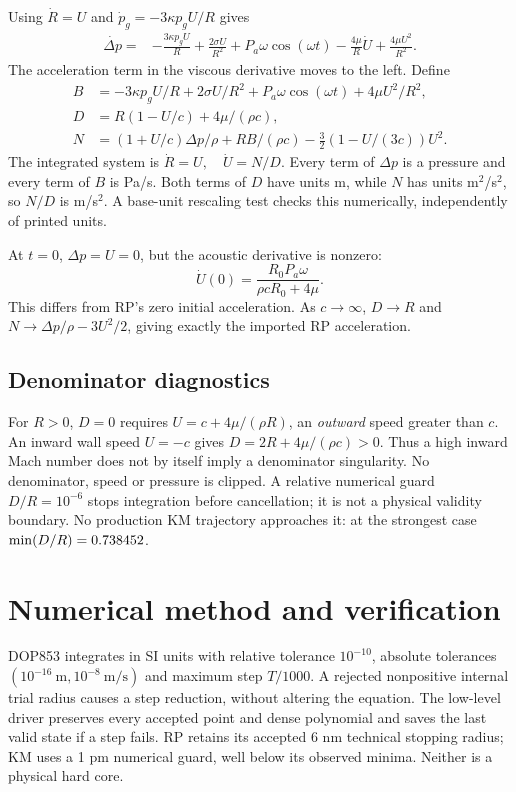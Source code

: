 \documentclass[10pt,a4paper]{article}
\begin{document}
Using $\dot R=U$ and $\dot p_g=-3\kappa p_gU/R$ gives
\begin{align}
 \dot{\Delta p}={}&-\frac{3\kappa p_gU}{R}+\frac{2\sigma U}{R^2}
 +P_a\omega\cos(\omega t)-\frac{4\mu}{R}\dot U+\frac{4\mu U^2}{R^2}.\label{eq:derivative}
\end{align}
The acceleration term in the viscous derivative moves to the left. Define
\begin{align}
 B&=-3\kappa p_gU/R+2\sigma U/R^2+P_a\omega\cos(\omega t)+4\mu U^2/R^2,\\
 D&=R(1-U/c)+4\mu/(\rho c),\label{eq:denom}\\
 N&=(1+U/c)\Delta p/\rho+RB/(\rho c)-\tfrac32(1-U/(3c))U^2.
\end{align}
The integrated system is $\boxed{\dot R=U,\quad\dot U=N/D}$. Every term of $\Delta p$ is a pressure and every term of $B$ is Pa/s. Both terms of $D$ have units m, while $N$ has units m$^2$/s$^2$, so $N/D$ is m/s$^2$. A base-unit rescaling test checks this numerically, independently of printed units.

At $t=0$, $\Delta p=U=0$, but the acoustic derivative is nonzero:
\begin{equation}
 \dot U(0)=\frac{R_0P_a\omega}{\rho cR_0+4\mu}.
\end{equation}
This differs from RP's zero initial acceleration. As $c\to\infty$, $D\to R$ and $N\to\Delta p/\rho-3U^2/2$, giving exactly the imported RP acceleration.

\subsection{Denominator diagnostics}
For $R>0$, $D=0$ requires $U=c+4\mu/(\rho R)$, an \emph{outward} speed greater than $c$. An inward wall speed $U=-c$ gives $D=2R+4\mu/(\rho c)>0$. Thus a high inward Mach number does not by itself imply a denominator singularity. No denominator, speed or pressure is clipped. A relative numerical guard $D/R=10^{-6}$ stops integration before cancellation; it is not a physical validity boundary. No production KM trajectory approaches it: at the strongest case $\min(D/R)=0.738452$.

\newpage
\section{Numerical method and verification}
DOP853 integrates in SI units with relative tolerance $10^{-10}$, absolute tolerances $(10^{-16}\ \mathrm{m},10^{-8}\ \mathrm{m/s})$ and maximum step $T/1000$. A rejected nonpositive internal trial radius causes a step reduction, without altering the equation. The low-level driver preserves every accepted point and dense polynomial and saves the last valid state if a step fails. RP retains its accepted 6 nm technical stopping radius; KM uses a 1 pm numerical guard, well below its observed minima. Neither is a physical hard core.
\end{document}
